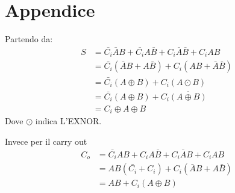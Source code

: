 \documentclass[a4paper,11pt]{article}
\begin{document}
	\section{Appendice} \label{app:a}
	Partendo da:
	\begin{equation}
		\begin{aligned}
			S &= \bar{C_i}\bar{A}B + \bar{C_i}A\bar{B} + C_i\bar{A}\bar{B} + C_iAB \\
			&= \bar{C_i}(\bar{A}B + A\bar{B}) + C_i(AB + \bar{A}\bar{B}) \\
			&= \bar{C_i}(A \oplus B) + C_i(A \odot B) \\
			&= \bar{C_i}(A \oplus B) + C_i\overline{(A \oplus B)} \\
			&= C_i \oplus A \oplus B
		\end{aligned}
	\end{equation}
	Dove $\odot$ indica L'EXNOR.
	
	
	Invece per il carry out
	\begin{equation}
		\begin{aligned}
			C_o &= \bar{C_i}AB + C_iA\bar{B} + C_i\bar{A}B + C_iAB \\
			&= AB(\bar{C_i} + C_i) + C_i(\bar{A}B + A\bar{B}) \\
			&= AB + C_i(A \oplus B)
		\end{aligned}
	\end{equation}
	
	
	
	\medskip
	
	\printbibliography
	
\end{document}
